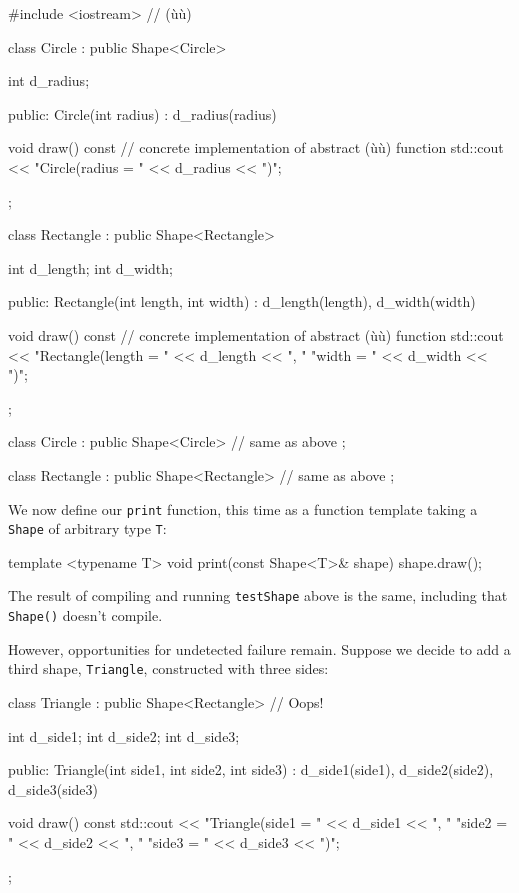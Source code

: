 \begin{emcppshiddenlisting}[emcppsbatch=e7]
#include <iostream>  // (ù{}ù)

class Circle : public Shape<Circle>
{
    int d_radius;

public:
    Circle(int radius) : d_radius(radius) { }

    void draw() const  // concrete implementation of abstract (ù{}ù) function
    {
        std::cout << "Circle(radius = " << d_radius << ")\n";
    }
};

class Rectangle : public Shape<Rectangle>
{
    int d_length;
    int d_width;

public:
    Rectangle(int length, int width) : d_length(length), d_width(width) { }

    void draw() const  // concrete implementation of abstract (ù{}ù) function
    {
        std::cout << "Rectangle(length = " << d_length << ", "
                                "width = " << d_width  << ")\n";
    }
};
\end{emcppshiddenlisting}
\begin{emcppslisting}[emcppsbatch=e7,emcppsignore={expanded as hidden listing}]
class Circle : public Shape<Circle>
{
    // same as above
};

class Rectangle : public Shape<Rectangle>
{
    // same as above
};
\end{emcppslisting}
    
\noindent We now define our \lstinline!print! function, this time as a function
template taking a \lstinline!Shape! of arbitrary type \lstinline!T!:

\begin{emcppslisting}[emcppsbatch=e7]
template <typename T>
void print(const Shape<T>& shape)
{
    shape.draw();
}
\end{emcppslisting}
    
\noindent The result of compiling and running \lstinline!testShape! above is the
same, including that \lstinline!Shape()! doesn't compile.

However, opportunities for undetected failure remain. Suppose we decide
to add a third shape, \lstinline!Triangle!, constructed with three sides:

\begin{emcppslisting}[emcppsbatch=e7]
class Triangle : public Shape<Rectangle>  // Oops!
{
    int d_side1;
    int d_side2;
    int d_side3;

public:
    Triangle(int side1, int side2, int side3)
        : d_side1(side1), d_side2(side2), d_side3(side3) { }

    void draw() const
    {
        std::cout << "Triangle(side1 = " << d_side1 << ", "
                              "side2 = " << d_side2 << ", "
                              "side3 = " << d_side3 << ")\n";
    }
};
\end{emcppslisting}
    
